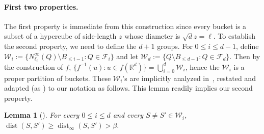 \documentclass[11pt,letterpaper]{article}
\theoremstyle{plain}
\newtheorem{lemma}[theorem]{Lemma}
\theoremstyle{definition}
\theoremstyle{remark}
\DeclareMathOperator{\dist}{dist}
\begin{document}
\paragraph{First two properties.}
The first property is immediate from this construction since every bucket is a subset of a hypercube of side-length $z$ whose diameter is $\sqrt{d} z = \ell$.
To establish the second property, we need to define the $d + 1$ groups.
For $0\leq i\leq d-1$, define $\mathcal{W}_{i}:= \{N_{\ell_{i}}^{\infty}(Q)\setminus B_{\leq i-1}: Q\in \mathcal{F}_{i} \}$ and let $\mathcal{W}_{d}:=\{Q\setminus B_{\leq d-1}: Q\in \mathcal{F}_{d}\}$. 
Then by the construction of $f$, $\{f^{-1}(u): u\in f(\mathbb{R}^{d})\} = \bigcup_{i=0}^{d}\mathcal{W}_{i}$, hence the $\mathcal{W}_i$ is a proper partition of buckets.
These $\mathcal{W}_i$'s are implicitly analyzed in~\cite[Lemma 5.5 and Lemma 5.8]{arxiv.2204.02095}, restated and adapted (as ) to our notation as follows.
This lemma readily implies our second property.
\begin{lemma}[{\cite[Lemma 5.5 and Lemma 5.8]{arxiv.2204.02095}}]
    \label{lemma:separation}
    For every $0 \leq i \leq d$ and every $S \neq S' \in \mathcal{W}_i$, $\dist(S, S') \geq \dist_\infty(S, S') > \beta$.
\end{lemma}
\end{document}
